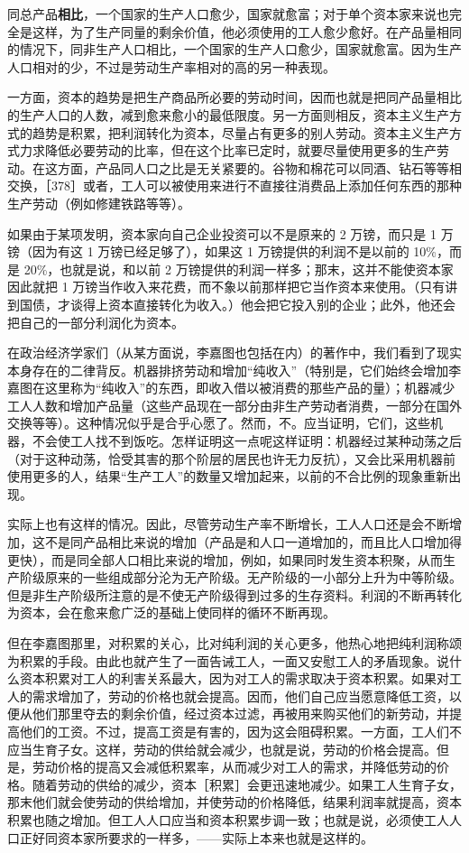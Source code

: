 同总产品\textbf{相比}，一个国家的生产人口愈少，国家就愈富；对于单个资本家来说也完全是这样，为了生产同量的剩余价值，他必须使用的工人愈少愈好。在产品量相同的情况下，同非生产人口相比，一个国家的生产人口愈少，国家就愈富。因为生产人口相对的少，不过是劳动生产率相对的高的另一种表现。

一方面，资本的趋势是把生产商品所必要的劳动时间，因而也就是把同产品量相比的生产人口的人数，减到愈来愈小的最低限度。另一方面则相反，资本主义生产方式的趋势是积累，把利润转化为资本，尽量占有更多的别人劳动。资本主义生产方式力求降低必要劳动的比率，但在这个比率已定时，就要尽量使用更多的生产劳动。在这方面，产品同人口之比是无关紧要的。谷物和棉花可以同酒、钻石等等相交换，［378］或者，工人可以被使用来进行不直接往消费品上添加任何东西的那种生产劳动（例如修建铁路等等）。

如果由于某项发明，资本家向自己企业投资可以不是原来的 2 万镑，而只是 1 万镑（因为有这 1 万镑已经足够了），如果这 1 万镑提供的利润不是以前的 10\%，而是 20\%，也就是说，和以前 2 万镑提供的利润一样多；那末，这并不能使资本家因此就把 1 万镑当作收入来花费，而不象以前那样把它当作资本来使用。（只有讲到国债，才谈得上资本直接转化为收入。）他会把它投入别的企业；此外，他还会把自己的一部分利润化为资本。

在政治经济学家们（从某方面说，李嘉图也包括在内）的著作中，我们看到了现实本身存在的二律背反。机器排挤劳动和增加“纯收入”（特别是，它们始终会增加李嘉图在这里称为“纯收入”的东西，即收入借以被消费的那些产品的量）；机器减少工人人数和增加产品量（这些产品现在一部分由非生产劳动者消费，一部分在国外交换等等）。这种情况似乎是合乎心愿了。然而，不。应当证明，它们，这些机器，不会使工人找不到饭吃。怎样证明这一点呢这样证明：机器经过某种动荡之后（对于这种动荡，恰受其害的那个阶层的居民也许无力反抗），又会比采用机器前使用更多的人，结果“生产工人”的数量又增加起来，以前的不合比例的现象重新出现。

实际上也有这样的情况。因此，尽管劳动生产率不断增长，工人人口还是会不断增加，这不是同产品相比来说的增加（产品是和人口一道增加的，而且比人口增加得更快），而是同全部人口相比来说的增加，例如，如果同时发生资本积聚，从而生产阶级原来的一些组成部分沦为无产阶级。无产阶级的一小部分上升为中等阶级。但是非生产阶级所注意的是不使无产阶级得到过多的生存资料。利润的不断再转化为资本，会在愈来愈广泛的基础上使同样的循环不断再现。

但在李嘉图那里，对积累的关心，比对纯利润的关心更多，他热心地把纯利润称颂为积累的手段。由此也就产生了一面告诫工人，一面又安慰工人的矛盾现象。说什么资本积累对工人的利害关系最大，因为对工人的需求取决于资本积累。如果对工人的需求增加了，劳动的价格也就会提高。因而，他们自己应当愿意降低工资，以便从他们那里夺去的剩余价值，经过资本过滤，再被用来购买他们的新劳动，并提高他们的工资。不过，提高工资是有害的，因为这会阻碍积累。一方面，工人们不应当生育子女。这样，劳动的供给就会减少，也就是说，劳动的价格会提高。但是，劳动价格的提高又会减低积累率，从而减少对工人的需求，并降低劳动的价格。随着劳动的供给的减少，资本［积累］会更迅速地减少。如果工人生育子女，那末他们就会使劳动的供给增加，并使劳动的价格降低，结果利润率就提高，资本积累也随之增加。但工人人口应当和资本积累步调一致；也就是说，必须使工人人口正好同资本家所要求的一样多，——实际上本来也就是这样的。

